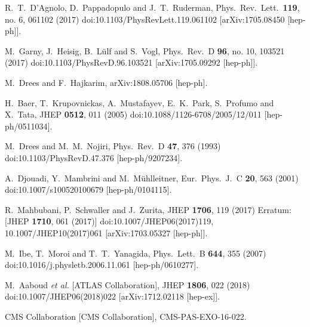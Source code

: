 \documentclass[nofootinbib,prd,aps,superscriptaddress,preprintnumbers]{revtex4}
\begin{document}
\begin{thebibliography}{99}
  R.~T.~D'Agnolo, D.~Pappadopulo and J.~T.~Ruderman,
  Phys.\ Rev.\ Lett.\  {\bf 119}, no. 6, 061102 (2017)
  doi:10.1103/PhysRevLett.119.061102
  [arXiv:1705.08450 [hep-ph]].

  M.~Garny, J.~Heisig, B.~L\"ulf and S.~Vogl,
  Phys.\ Rev.\ D {\bf 96}, no. 10, 103521 (2017)
  doi:10.1103/PhysRevD.96.103521
  [arXiv:1705.09292 [hep-ph]].

  M.~Drees and F.~Hajkarim,
  arXiv:1808.05706 [hep-ph].

  H.~Baer, T.~Krupovnickas, A.~Mustafayev, E.~K.~Park, S.~Profumo and X.~Tata,
  JHEP {\bf 0512}, 011 (2005)
  doi:10.1088/1126-6708/2005/12/011
  [hep-ph/0511034].

  M.~Drees and M.~M.~Nojiri,
  Phys.\ Rev.\ D {\bf 47}, 376 (1993)
  doi:10.1103/PhysRevD.47.376
  [hep-ph/9207234].

  A.~Djouadi, Y.~Mambrini and M.~M\"uhlleitner,
  Eur.\ Phys.\ J.\ C {\bf 20}, 563 (2001)
  doi:10.1007/s100520100679      [hep-ph/0104115].

  R.~Mahbubani, P.~Schwaller and J.~Zurita,
  JHEP {\bf 1706}, 119 (2017)
  Erratum: [JHEP {\bf 1710}, 061 (2017)]
  doi:10.1007/JHEP06(2017)119, 10.1007/JHEP10(2017)061
  [arXiv:1703.05327 [hep-ph]].

  M.~Ibe, T.~Moroi and T.~T.~Yanagida,
  Phys.\ Lett.\ B {\bf 644}, 355 (2007)
  doi:10.1016/j.physletb.2006.11.061
  [hep-ph/0610277].

  M.~Aaboud {\it et al.} [ATLAS Collaboration],
  JHEP {\bf 1806}, 022 (2018)
  doi:10.1007/JHEP06(2018)022
  [arXiv:1712.02118 [hep-ex]].

  CMS Collaboration [CMS Collaboration],
  CMS-PAS-EXO-16-022.


\end{thebibliography}
\end{document}
